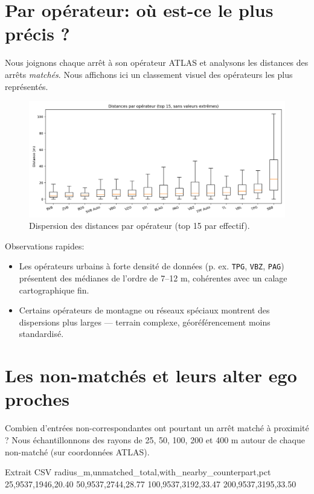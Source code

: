 \section{Par opérateur: où est-ce le plus précis ?}

Nous joignons chaque arrêt à son opérateur ATLAS et analysons les distances des arrêts 
\textit{matchés}. Nous affichons ici un classement visuel des opérateurs les plus représentés.

\begin{figure}[H]
    \centering
    \includegraphics[width=\textwidth]{../figures/chap5/distances_by_operator_box.png}
    \caption[Distances par opérateur]{Dispersion des distances par opérateur (top 15 par effectif).}
\end{figure}

Observations rapides:
\begin{itemize}
    \item Les opérateurs urbains à forte densité de données (p. ex. \texttt{TPG}, \texttt{VBZ}, \texttt{PAG}) présentent des médianes de l'ordre de 7–12 m, cohérentes avec un calage cartographique fin.
    \item Certains opérateurs de montagne ou réseaux spéciaux montrent des dispersions plus larges — terrain complexe, géoréférencement moins standardisé.
\end{itemize}

\section{Les non-matchés et leurs \og alter ego \fg{} proches}

Combien d'entrées non-correspondantes ont pourtant un arrêt matché à proximité ? Nous échantillonnons 
des rayons de 25, 50, 100, 200 et 400 m autour de chaque non-matché (sur coordonnées ATLAS).

\begin{codebox}{Extrait CSV}
radius_m,unmatched_total,with_nearby_counterpart,pct
25,9537,1946,20.40
50,9537,2744,28.77
100,9537,3192,33.47
200,9537,3195,33.50
\end{codebox}

